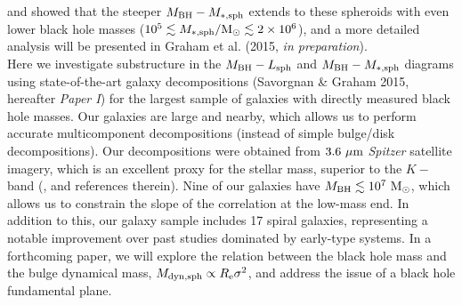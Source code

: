 \documentclass[preprint2]{emulateapj}
\begin{document}
and showed that the steeper $M_{\rm BH} - M_{\rm *,sph}$ extends to these spheroids with even lower black hole masses 
($10^{5} \lesssim M_{\rm *,sph}/{\rm M_\odot} \lesssim 2 \times 10^{6}$), 
and a more detailed analysis will be presented in Graham et al. (2015, \emph{in preparation}).  \\
Here we investigate substructure in the $M_{\rm BH} - L_{\rm sph}$ and $M_{\rm BH} - M_{\rm *,sph}$ diagrams 
using state-of-the-art galaxy decompositions (Savorgnan \& Graham 2015, hereafter \emph{Paper I}) 
for the largest sample of galaxies with directly measured black hole masses.
Our galaxies are large and nearby, which allows us to perform accurate multicomponent decompositions 
(instead of simple bulge/disk decompositions). 
Our decompositions were obtained from $3.6\rm~\mu m$ \emph{Spitzer} satellite imagery, 
which is an excellent proxy for the stellar mass, superior to the $K-$band (\citealt{sheth2010}, and references therein).
Nine of our galaxies have $M_{\rm BH} \lesssim 10^7\rm~M_\odot$, 
which allows us to constrain the slope of the correlation at the low-mass end.
In addition to this, our galaxy sample includes 17 spiral galaxies, 
representing a notable improvement over past studies dominated by early-type systems. 
In a forthcoming paper, we will explore the relation between the black hole mass and the bulge dynamical mass, 
$M_{\rm dyn,sph} \propto R_{\rm e} \sigma^2$, and address the issue of a black hole fundamental plane.
\end{document}
